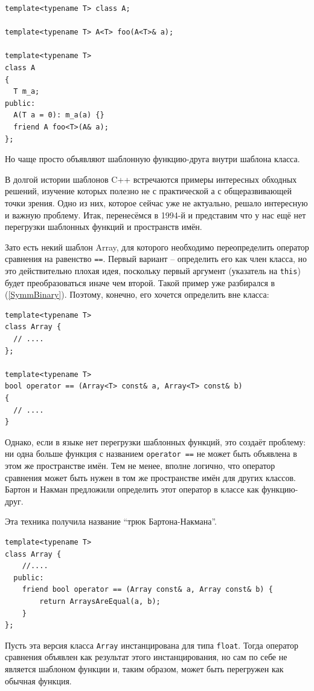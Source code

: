 \documentclass[a4paper,12pt,oneside]{book}
\begin{document}
\begin{lstlisting}
template<typename T> class A;

template<typename T> A<T> foo(A<T>& a);

template<typename T>
class A
{
  T m_a;
public:
  A(T a = 0): m_a(a) {}
  friend A foo<T>(A& a);
};
\end{lstlisting}

Но чаще просто объявляют шаблонную функцию-друга внутри шаблона класса.

В долгой истории шаблонов C++ встречаются примеры интересных обходных решений, изучение которых полезно не с практической а с общеразвивающей точки зрения. Одно из них, которое сейчас уже не актуально, решало интересную и важную проблему. Итак, перенесёмся в 1994-й и представим что у нас ещё нет перегрузки шаблонных функций и пространств имён.

Зато есть некий шаблон Array, для которого необходимо переопределить оператор сравнения на равенство \lstinline!==!. Первый вариант -- определить его как член класса, но это действительно плохая идея, поскольку первый аргумент (указатель на \lstinline!this!) будет преобразоваться иначе чем второй. Такой пример уже разбирался в (\ref{SymmBinary}). Поэтому, конечно, его хочется определить вне класса:

\begin{lstlisting}
template<typename T> 
class Array { 
  // ....
}; 

template<typename T> 
bool operator == (Array<T> const& a, Array<T> const& b) 
{ 
  // .... 
} 
\end{lstlisting}

Однако, если в языке нет перегрузки шаблонных функций, это создаёт проблему: ни одна больше функция с названием \lstinline!operator ==! не может быть объявлена в этом же пространстве имён. Тем не менее, вполне логично, что оператор сравнения может быть нужен в том же пространстве имён для других классов. Бартон и Накман предложили определить этот оператор в классе как функцию-друг.

Эта техника получила название ``трюк Бартона-Накмана''.

\begin{lstlisting}
template<typename T> 
class Array { 
    //....
  public: 
    friend bool operator == (Array const& a, Array const& b) {
        return ArraysAreEqual(a, b); 
    } 
}; 
\end{lstlisting}

Пусть эта версия класса \lstinline!Array! инстанцирована для типа \lstinline!float!. Тогда оператор сравнения объявлен как результат этого инстанцирования, но сам по себе не является шаблоном функции и, таким образом, может быть перегружен как обычная функция.
\end{document}
